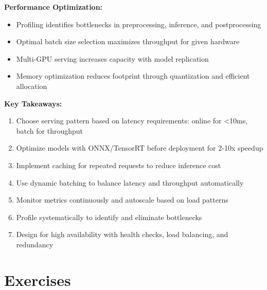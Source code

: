\textbf{Performance Optimization:}
\begin{itemize}
    \item Profiling identifies bottlenecks in preprocessing, inference, and postprocessing
    \item Optimal batch size selection maximizes throughput for given hardware
    \item Multi-GPU serving increases capacity with model replication
    \item Memory optimization reduces footprint through quantization and efficient allocation
\end{itemize}

\textbf{Key Takeaways:}
\begin{enumerate}
    \item Choose serving pattern based on latency requirements: online for <10ms, batch for throughput
    \item Optimize models with ONNX/TensorRT before deployment for 2-10x speedup
    \item Implement caching for repeated requests to reduce inference cost
    \item Use dynamic batching to balance latency and throughput automatically
    \item Monitor metrics continuously and autoscale based on load patterns
    \item Profile systematically to identify and eliminate bottlenecks
    \item Design for high availability with health checks, load balancing, and redundancy
\end{enumerate}

\section{Exercises}


